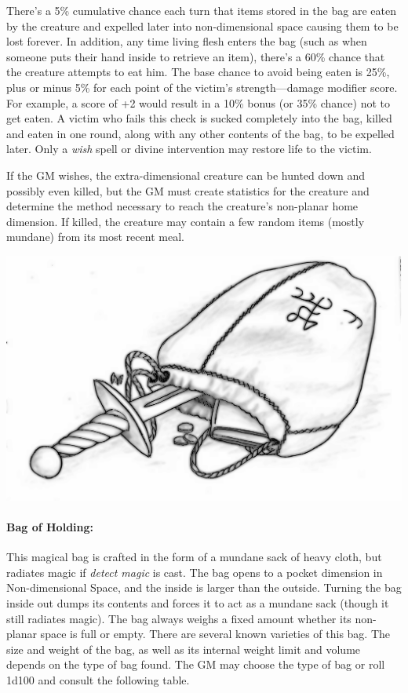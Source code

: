 \begin{multicols}{2}
There's a 5\% cumulative chance each turn that items stored in the bag are eaten by the creature and expelled later into non-dimensional space causing them to be lost forever.  In addition, any time living flesh enters the bag (such as when someone puts their hand inside to retrieve an item), there's a 60\% chance that the creature attempts to eat him.  The base chance to avoid being eaten is 25\%, plus or minus 5\% for each point of the victim's strength---damage modifier score.  For example, a score of +2 would result in a 10\% bonus (or 35\% chance) not to get eaten.  A victim who fails this check is sucked completely into the bag, killed and eaten in one round, along with any other contents of the bag, to be expelled later.  Only a \textit{wish} spell or divine intervention may restore life to the victim.

If the GM wishes, the extra-dimensional creature can be hunted down and possibly even killed, but the GM must create statistics for the creature and determine the method necessary to reach the creature's non-planar home dimension.  If killed, the creature may contain a few random items (mostly mundane) from its most recent meal. 

\noindent\includegraphics[width=\columnwidth]{bagofholding.pdf}\label{bagofholding}

\columnbreak

\paragraph{Bag of Holding:} This magical bag is crafted in the form of a mundane sack of heavy cloth, but radiates magic if \textit{detect magic} is cast.  The bag opens to a pocket dimension in Non-dimensional Space, and the inside is larger than the outside.  Turning the bag inside out dumps its contents and forces it to act as a mundane sack (though it still radiates magic).  The bag always weighs a fixed amount whether its non-planar space is full or empty.  There are several known varieties of this bag.  The size and weight of the bag, as well as its internal weight limit and volume depends on the type of bag found.  The GM may choose the type of bag or roll 1d100 and consult the following table.


\end{multicols}
